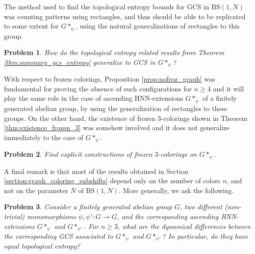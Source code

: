 \documentclass[cupthm,crop,info]{CUP-JNL-ETS}%
\theoremstyle{cupplain}
\newtheorem*{problem*}{Problem}
\theoremstyle{cupdefinition}
\theoremstyle{cupremark}
\theoremstyle{cupproof}
\numberwithin{equation}{section}
\newcommand{\BS}[1][N]{\mathrm{BS}(1,#1)}
\begin{document}
The method used to find the topological entropy bounds for GCS in $\BS$ was counting patterns using rectangles, and thus should be able to be replicated to some extent for $G*_{\psi}$, using the natural generalizations of rectangles to this group. 
\begin{problem*}
	How do the topological entropy related results from Theorem \ref{thm:summary_gcs_entropy} generalize to GCS in $G*_{\psi}$?
\end{problem*}
With respect to frozen colorings, Proposition \ref{prop:nofroz_graph} was fundamental for proving the absence of such configurations for $n\ge 4$ and it will play the same role in the case of ascending HNN-extensions $G*_{\psi}$ of a finitely generated abelian group, by using the generalization of rectangles to these groups. On the other hand, the existence of frozen $3$-colorings shown in Theorem \ref{thm:existence_frozen_3} was somehow involved and it does not generalize immediately to the case of $G*_{\psi}$.
\begin{problem*}
	Find explicit constructions of frozen $3$-colorings on $G*_{\psi}$.
\end{problem*}

A final remark is that most of the results obtained in Section \ref{section:graph_coloring_subshifts} depend only on the number of colors $n$, and not on the parameter $N$ of $\BS$. More generally, we ask the following.
\begin{problem*}
	Consider a finitely generated abelian group $G$, two different (non-trivial) monomorphisms $\psi, \psi':G\to G$, and the corresponding ascending HNN-extensions $G*_{\psi}$ and $G*_{\psi'}$. For $n\ge 3$, what are the dynamical differences between the corresponding GCS associated to $G*_{\psi}$ and $G*_{\psi'}$? In particular, do they have equal topological entropy?
\end{problem*}
\end{document}
